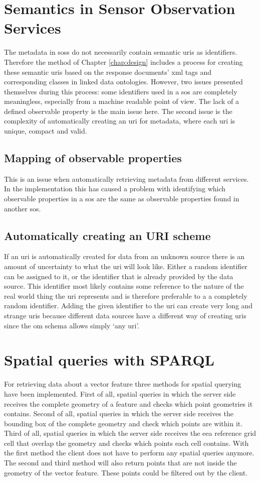 \section{Semantics in Sensor Observation Services}
The metadata in \aclp{sos} do not necessarily contain semantic \acp{uri} as identifiers. Therefore the method of Chapter \ref{chap:design} includes a process for creating these semantic \acp{uri} based on the response documents' \ac{xml} tags and corresponding classes in linked data ontologies. However, two issues presented themselves during this process: some identifiers used in a \ac{sos} are completely meaningless, especially from a machine readable point of view. The lack of a defined observable property is the main issue here. The second issue is the complexity of automatically creating an \ac{uri} for metadata, where each \ac{uri} is unique, compact and valid.  

\subsection{Mapping of observable properties}
This is an issue when automatically retrieving metadata from different services. In the implementation this has caused a problem with identifying which observable properties in a \ac{sos} are the same as observable properties found in another \ac{sos}.

\subsection{Automatically creating an URI scheme}
If an \ac{uri} is automatically created for data from an unknown source there is an amount of uncertainty to what the \ac{uri} will look like. Either a random identifier can be assigned to it, or the identifier that is already provided by the data source. This identifier most likely contains some reference to the nature of the real world thing the \ac{uri} represents and is therefore preferable to a a completely random identifier. Adding the given identifier to the \ac{uri} can create very long and strange \acp{uri} because different data sources have a different way of creating \acp{uri} since the \ac{om} schema allows simply `any \ac{uri}'.   

\section{Spatial queries with SPARQL}
\label{par:spQueries}
For retrieving data about a vector feature three methods for spatial querying have been implemented. First of all, spatial queries in which the server side receives the complete geometry of a feature and checks which point geometries it contains. Second of all, spatial queries in which the server side receives the bounding box of the complete geometry and check which points are within it. Third of all, spatial queries in which the server side receives the \ac{eea} reference grid cell that overlap the geometry and checks which points each cell contains. With the first method the client does not have to perform any spatial queries anymore. The second and third method will also return points that are not inside the geometry of the vector feature. These points could be filtered out by the client. 

